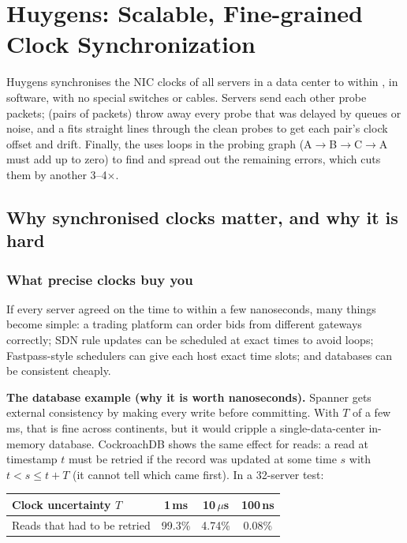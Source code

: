 \chapter{Huygens: Scalable, Fine-grained Clock Synchronization}

\begin{keybox}
Huygens synchronises the NIC clocks of all servers in a data center to within , in software, with no special
switches or cables. Servers send each other probe packets;  (pairs of packets) throw away every probe that was
delayed by queues or noise, and a  fits straight lines through the clean probes to get each pair's
clock offset and drift. Finally, the  uses loops in the probing graph (A$\to$B$\to$C$\to$A must add up to zero)
to find and spread out the remaining errors, which cuts them by another 3--4$\times$.
\end{keybox}

\section{Why synchronised clocks matter, and why it is hard}

\subsection{What precise clocks buy you}
If every server agreed on the time to within a few nanoseconds, many things become simple: a trading platform can order bids from different
gateways correctly; SDN rule updates can be scheduled at exact times to avoid loops; Fastpass-style schedulers can give each host exact time
slots; and databases can be consistent cheaply.

\textbf{The database example (why it is worth nanoseconds).} Spanner gets external consistency by making every write  before committing. With $T$ of a few ms, that is fine across continents, but it would cripple a single-data-center
in-memory database. CockroachDB shows the same effect for reads: a read at timestamp $t$ must be retried if the record was updated at some
time $s$ with $t < s \le t + T$ (it cannot tell which came first). In a 32-server test:
\begin{center}
\begin{tabular}{@{}lccc@{}}
\toprule
Clock uncertainty $T$ & 1\,ms & 10\,$\mu$s & 100\,ns\\
\midrule
Reads that had to be retried & 99.3\% & 4.74\% & 0.08\%\\
\bottomrule
\end{tabular}
\end{center}

